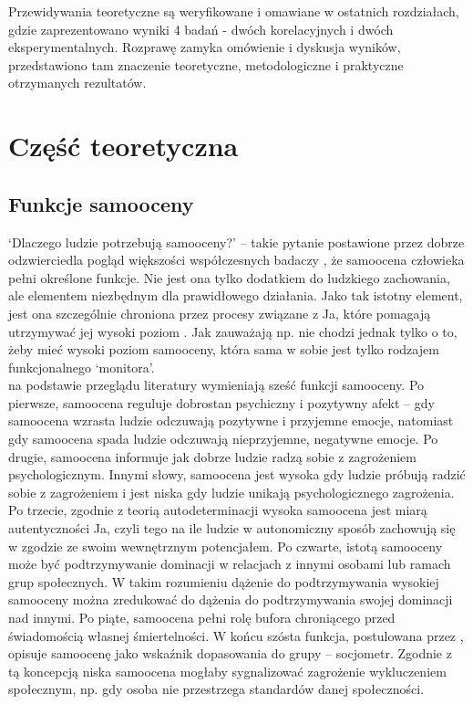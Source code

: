 \documentclass[man]{apa6}
\begin{document}
Przewidywania teoretyczne są weryfikowane i omawiane w ostatnich rozdziałach, gdzie zaprezentowano wyniki 4 badań - dwóch korelacyjnych i dwóch eksperymentalnych. Rozprawę zamyka omówienie i dyskusja wyników, przedstawiono tam znaczenie teoretyczne, metodologiczne i praktyczne otrzymanych rezultatów. \\

\newpage
\section{Część teoretyczna}
\subsection{Funkcje samooceny}

`Dlaczego ludzie potrzebują samooceny?' -- takie pytanie postawione przez \textcite{pyszczynski2004people} dobrze odzwierciedla pogląd większości współczesnych badaczy \parencite[zob. również, ][]{bandura1994self, leary1995self}, że samoocena człowieka pełni określone funkcje. Nie jest ona tylko dodatkiem do ludzkiego zachowania, ale elementem niezbędnym dla prawidłowego działania. Jako tak istotny element, jest ona szczególnie chroniona przez procesy związane z Ja, które pomagają utrzymywać jej wysoki poziom \parencite{greenwald1980totalitarian}. Jak zauważają np. \textcite{leary2000nature} nie chodzi jednak tylko o to, żeby mieć wysoki poziom samooceny, która sama w sobie jest tylko rodzajem funkcjonalnego `monitora'.\\

\textcite{leary2000nature} na podstawie przeglądu literatury wymieniają sześć funkcji samooceny. Po pierwsze, samoocena reguluje dobrostan psychiczny i pozytywny afekt -- gdy samoocena wzrasta ludzie odczuwają pozytywne i przyjemne emocje, natomiast gdy samoocena spada ludzie odczuwają nieprzyjemne, negatywne emocje. Po drugie, samoocena informuje jak dobrze ludzie radzą sobie z zagrożeniem psychologicznym. Innymi słowy, samoocena jest wysoka gdy ludzie próbują radzić sobie z zagrożeniem i jest niska gdy ludzie unikają psychologicznego zagrożenia. Po trzecie, zgodnie z teorią autodeterminacji \parencite{deci2000and} wysoka samoocena jest miarą autentyczności Ja, czyli tego na ile ludzie w autonomiczny sposób zachowują się w zgodzie ze swoim wewnętrznym potencjałem. Po czwarte, istotą samooceny może być podtrzymywanie dominacji w relacjach z innymi osobami lub ramach grup społecznych. W takim rozumieniu dążenie do podtrzymywania wysokiej samooceny można zredukować do dążenia do podtrzymywania swojej dominacji nad innymi. Po piąte, samoocena pełni rolę bufora chroniącego przed świadomością własnej śmiertelności. W końcu szósta funkcja, postulowana przez \textcite{leary2000nature}, opisuje samoocenę jako wskaźnik dopasowania do grupy -- socjometr. Zgodnie z tą koncepcją niska samoocena mogłaby sygnalizować zagrożenie wykluczeniem społecznym, np. gdy osoba nie przestrzega standardów danej społeczności.\\
\end{document}
